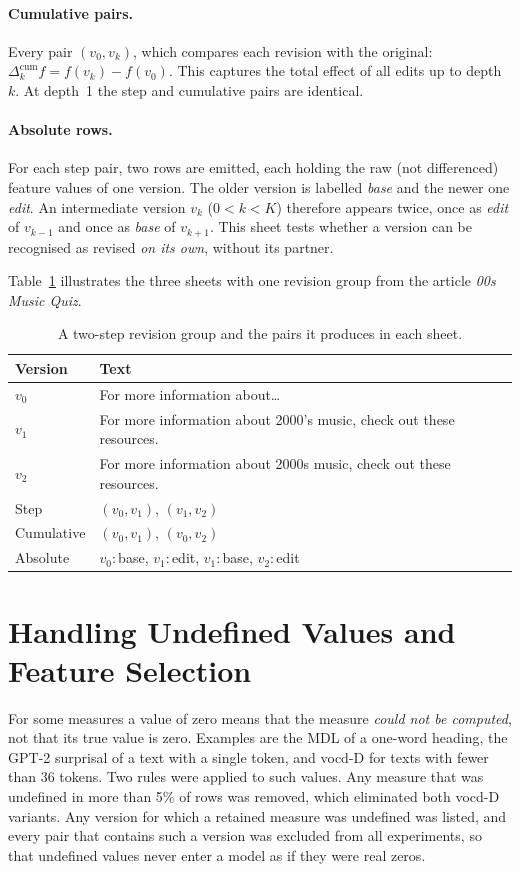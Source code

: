 \documentclass[12pt,a4paper,oneside]{report}
\begin{document}
\paragraph{Cumulative pairs.} Every pair $(v_0, v_k)$, which compares each revision with the original: $\Delta^{\text{cum}}_k f = f(v_k) - f(v_0)$. This captures the total effect of all edits up to depth $k$. At depth~1 the step and cumulative pairs are identical.

\paragraph{Absolute rows.} For each step pair, two rows are emitted, each holding the raw (not differenced) feature values of one version. The older version is labelled \emph{base} and the newer one \emph{edit}. An intermediate version $v_k$ ($0 < k < K$) therefore appears twice, once as \emph{edit} of $v_{k-1}$ and once as \emph{base} of $v_{k+1}$. This sheet tests whether a version can be recognised as revised \emph{on its own}, without its partner.

Table~\ref{tab:example} illustrates the three sheets with one revision group from the article \emph{00s Music Quiz}.

\begin{table}[ht]
\centering
\small
\caption{A two-step revision group and the pairs it produces in each sheet.}
\label{tab:example}
\begin{tabularx}{\textwidth}{@{}lX@{}}
\toprule
Version & Text\\
\midrule
$v_0$ & For more information about\ldots\\
$v_1$ & For more information about 2000's music, check out these resources.\\
$v_2$ & For more information about 2000s music, check out these resources.\\
\midrule
Step & $(v_0, v_1)$, $(v_1, v_2)$\\
Cumulative & $(v_0, v_1)$, $(v_0, v_2)$\\
Absolute & $v_0$:\,base, $v_1$:\,edit, $v_1$:\,base, $v_2$:\,edit\\
\bottomrule
\end{tabularx}
\end{table}

\section{Handling Undefined Values and Feature Selection}
\label{sec:featsel}
For some measures a value of zero means that the measure \emph{could not be computed}, not that its true value is zero. Examples are the MDL of a one-word heading, the GPT-2 surprisal of a text with a single token, and vocd-D for texts with fewer than 36 tokens. Two rules were applied to such values. Any measure that was undefined in more than 5\% of rows was removed, which eliminated both vocd-D variants. Any version for which a retained measure was undefined was listed, and every pair that contains such a version was excluded from all experiments, so that undefined values never enter a model as if they were real zeros.
\end{document}
